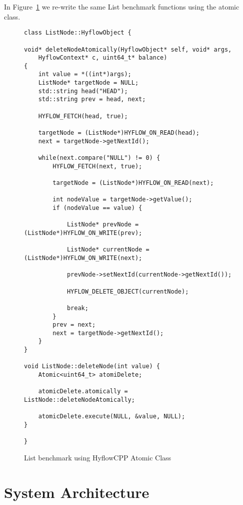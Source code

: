 \documentclass[12pt,english]{report}
\begin{document}
In Figure~\ref{Fig:listClassDelete} we re-write the same List benchmark functions using the atomic class. 

\begin{figure}
\centering
\begin{lstlisting}
class ListNode::HyflowObject {

void* deleteNodeAtomically(HyflowObject* self, void* args,
	HyflowContext* c, uint64_t* balance)
{
	int value = *((int*)args);
	ListNode* targetNode = NULL;
	std::string head("HEAD");
	std::string prev = head, next;

	HYFLOW_FETCH(head, true);
	
	targetNode = (ListNode*)HYFLOW_ON_READ(head);
	next = targetNode->getNextId();

	while(next.compare("NULL") != 0) {
		HYFLOW_FETCH(next, true);
		
		targetNode = (ListNode*)HYFLOW_ON_READ(next);
		
		int nodeValue = targetNode->getValue();
		if (nodeValue == value) {
		
			ListNode* prevNode = (ListNode*)HYFLOW_ON_WRITE(prev);
			
			ListNode* currentNode = (ListNode*)HYFLOW_ON_WRITE(next);
			
			prevNode->setNextId(currentNode->getNextId());
			
			HYFLOW_DELETE_OBJECT(currentNode);
			
			break;
		}
		prev = next;
		next = targetNode->getNextId();
	}
}

void ListNode::deleteNode(int value) {
	Atomic<uint64_t> atomiDelete;	
	
	atomicDelete.atomically = ListNode::deleteNodeAtomically;
	
	atomicDelete.execute(NULL, &value, NULL);
}

}
\end{lstlisting}
\caption{List benchmark using HyflowCPP Atomic Class}
\label{Fig:listClassDelete}
\end{figure}


\chapter{System Architecture}\label{chap:sysArch}
\end{document}
